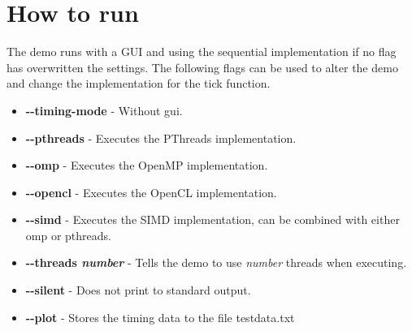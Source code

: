 \documentclass[a4paper,11pt]{article}
\begin{document}
\section{How to run}
The demo runs with a GUI and using the sequential implementation
if no flag has overwritten the settings. The following flags can be
used to alter the demo and change the implementation for the tick
function.
\begin{itemize}[label=,leftmargin=0pt]
\item \textbf{-\--timing-mode} - Without gui.
\item \textbf{-\--pthreads} - Executes the PThreads implementation.
\item \textbf{-\--omp} - Executes the OpenMP implementation.
\item \textbf{-\--opencl} - Executes the OpenCL implementation.
\item \textbf{-\--simd} - Executes the SIMD implementation, can be
  combined with either omp or pthreads.
\item \textbf{-\--threads \textit{number}} - Tells the demo to use
  \textit{number} threads when executing.
\item \textbf{-\--silent} - Does not print to standard output.
\item \textbf{-\--plot} - Stores the timing data to the file
  testdata.txt
\end{itemize}
\end{document}

